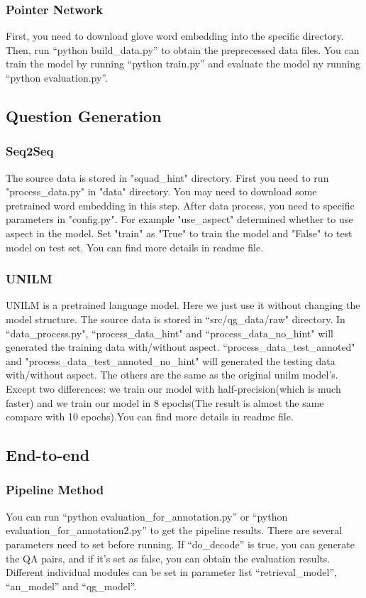 \subsubsection{Pointer Network}
First, you need to download glove word embedding into the specific directory.
Then, run ``python build\_data.py'' to obtain the preprecessed data files.
You can train the model by running ``python train.py'' and evaluate the model ny running ``python evaluation.py''.

\subsection{Question Generation}
\subsubsection{Seq2Seq}
The source data is stored in "squad\_hint" directory. First you need to run "process\_data.py" in "data" directory. You may need to download some pretrained word embedding in this step. After data process, you need to specific parameters in "config.py". For example "use\_aspect" determined whether to use aspect in the model. Set "train" as "True" to train the model and "False" to test model on test set. You can find more details in readme file.

\subsubsection{UNILM}
UNILM is a pretrained language model. Here we just use it without changing the model structure. The source data is stored in ``src/qg\_data/raw" directory. In ``data\_process.py", ``process\_data\_hint" and ``process\_data\_no\_hint" will generated the training data with/without aspect. ``process\_data\_test\_annoted" and "process\_data\_test\_annoted\_no\_hint" will generated the testing data with/without aspect. The others are the same as the original unilm model's. Except two differences: we train our model with half-precision(which is much faster) and we train our model in 8 epochs(The result is almost the same compare with 10 epochs).You can find more details in readme file.
\subsection{End-to-end}
\subsubsection{Pipeline Method}
You can run ``python evaluation\_for\_annotation.py'' or ``python evaluation\_for\_annotation2.py'' to get the pipeline results.
There are several parameters need to set before running. If ``do\_decode'' is true, you can generate the QA pairs, and if it's set as false, you can obtain the evaluation results.
Different individual modules can be set in parameter list ``retrieval\_model'', ``an\_model'' and ``qg\_model''.

